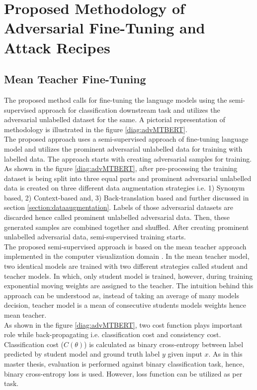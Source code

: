 \documentclass[%
	BCOR=8mm, %
	DIV=12,
	toc=bibliography, %
	toc=listof, %
	oneside, %
	egregdoesnotlikesansseriftitles, %
	]{scrbook}
\begin{document}

\chapter{ Proposed Methodology of Adversarial Fine-Tuning and Attack Recipes}
\label{chapter:methodology}
\section{Mean Teacher Fine-Tuning}
\label{section:Meanteacher}
The proposed method calls for fine-tuning the language models using the semi-supervised approach for classification downstream task and utilizes the adversarial unlabelled dataset for the same. A pictorial representation of methodology is illustrated in the figure \ref{diag:advMTBERT}.\\
The proposed approach uses a semi-supervised approach of fine-tuning language model and utilizes the prominent adversarial unlabelled data for training with labelled data. The approach  starts with creating adversarial samples for training. As shown in the figure \ref{diag:advMTBERT}, after pre-processing the training dataset is being split into three equal parts and prominent adversarial unlabelled data is created on three different data augmentation strategies i.e. 1) Synonym based, 2) Context-based and, 3) Back-translation based and further discussed in section \ref{section:dataaugmentation}. Labels of those adversarial datasets are discarded hence called prominent unlabelled adversarial data. Then, these generated samples are combined together and shuffled. After creating prominent unlabelled adversarial data, semi-supervised training starts.\\
The proposed semi-supervised approach is based on the mean teacher approach implemented in the computer visualization domain \cite{tarvainen_mean_2018}. In the mean teacher model, two identical models are trained with two different strategies called student and teacher models. In which, only student model is trained, however, during training exponential moving weights are assigned to the teacher. The intuition behind this approach can be understood as, instead of taking an average of many models decision, teacher model is a mean of consecutive students models weights hence mean teacher. \\
As shown in the figure \ref{diag:advMTBERT}, two cost function plays important role while back-propagating i.e. classification cost and consistency cost. Classification cost ($C(\theta)$) is calculated as binary cross-entropy between label predicted by student model and ground truth label $y$ given input $x$.  As in this master thesis, evaluation is performed against binary classification task, hence, binary cross-entropy loss is used. However, loss function can be utilized as per task.\\
\end{document}
